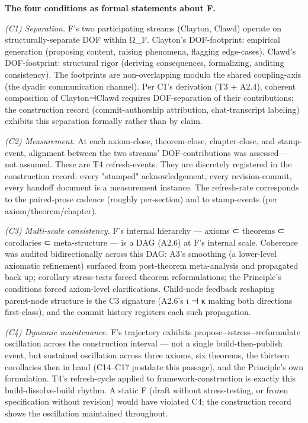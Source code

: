 \documentclass[11pt, openany]{book}
\begin{document}
\textbf{The four conditions as formal statements about F.}

\textit{(C1) Separation.} F's two participating streams (Clayton, Clawd) operate on structurally-separate DOF within Ω\_\allowbreak{}F. Clayton's DOF-footprint: empirical generation (proposing content, raising phenomena, flagging edge-cases). Clawd's DOF-footprint: structural rigor (deriving consequences, formalizing, auditing consistency). The footprints are non-overlapping modulo the shared coupling-axis (the dyadic communication channel). Per C1's derivation (T3 + A2.4), coherent composition of Clayton⊣Clawd requires DOF-separation of their contributions; the construction record (commit-authorship attribution, chat-transcript labeling) exhibits this separation formally rather than by claim.

\textit{(C2) Measurement.} At each axiom-close, theorem-close, chapter-close, and stamp-event, alignment between the two streams' DOF-contributions was assessed --- not assumed. These are T4 refresh-events. They are discretely registered in the construction record: every "stamped" acknowledgement, every revision-commit, every handoff document is a measurement instance. The refresh-rate corresponds to the paired-prose cadence (roughly per-section) and to stamp-events (per axiom/theorem/chapter).

\textit{(C3) Multi-scale consistency.} F's internal hierarchy --- axioms ⊂ theorems ⊂ corollaries ⊂ meta-structure --- is a DAG (A2.6) at F's internal scale. Coherence was audited bidirectionally across this DAG: A3's smoothing (a lower-level axiomatic refinement) surfaced from post-theorem meta-analysis and propagated back up; corollary stress-tests forced theorem reformulations; the Principle's conditions forced axiom-level clarifications. Child-node feedback reshaping parent-node structure is the C3 signature (A2.6's ι ⊣ κ making both directions first-class), and the commit history registers each such propagation.

\textit{(C4) Dynamic maintenance.} F's trajectory exhibits propose→stress→reformulate oscillation across the construction interval --- not a single build-then-publish event, but sustained oscillation across three axioms, six theorems, the thirteen corollaries then in hand (C14–C17 postdate this passage), and the Principle's own formulation. T4's refresh-cycle applied to framework-construction is exactly this build-dissolve-build rhythm. A static F (draft without stress-testing, or frozen specification without revision) would have violated C4; the construction record shows the oscillation maintained throughout.
\end{document}
